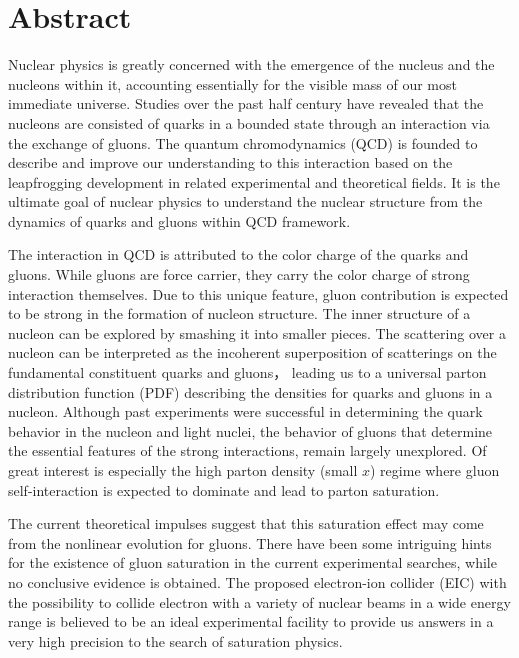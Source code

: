 \chapter*{\LARGE \bfseries {Abstract}}

\normalsize { 

Nuclear physics is greatly concerned with the emergence of the nucleus
and the nucleons within it, accounting essentially for the visible mass of our
most immediate universe. Studies over the past half century have revealed that
the nucleons are consisted of quarks in a bounded state through an interaction
via the exchange of gluons. The quantum chromodynamics (QCD) is founded to
describe and improve our understanding to this interaction based on the
leapfrogging development in related experimental and theoretical fields. It is
the ultimate goal of nuclear physics to understand the nuclear structure from
the dynamics of quarks and gluons within QCD framework.

The interaction in QCD is attributed to the color charge of the quarks
and gluons. While gluons are force carrier, they carry the color charge of strong interaction themselves.
Due to this unique feature, gluon contribution is expected to be strong in the
formation of nucleon structure. The inner structure of a nucleon can be explored
by smashing it into smaller pieces. The scattering over a nucleon can be interpreted
as the incoherent superposition of scatterings on the fundamental constituent
quarks and gluons， leading us to a universal parton distribution function (PDF)
describing the densities for quarks and gluons in a nucleon. Although past
experiments were successful in determining the quark behavior in the nucleon and
light nuclei, the behavior of gluons that determine the essential features of the strong
interactions, remain largely unexplored. Of great interest is especially the
high parton density (small $x$) regime where gluon self-interaction is expected to
dominate and lead to parton saturation. 

The current theoretical impulses suggest that this saturation effect may come
from the nonlinear evolution for gluons. There have been some intriguing hints
for the existence of gluon saturation in the current experimental searches, while
no conclusive evidence is obtained. The proposed electron-ion collider (EIC) with
the possibility to collide electron with a variety of nuclear beams in a wide energy range is
believed to be an ideal experimental facility to provide us answers in a very high
precision to the search of saturation physics.

}
